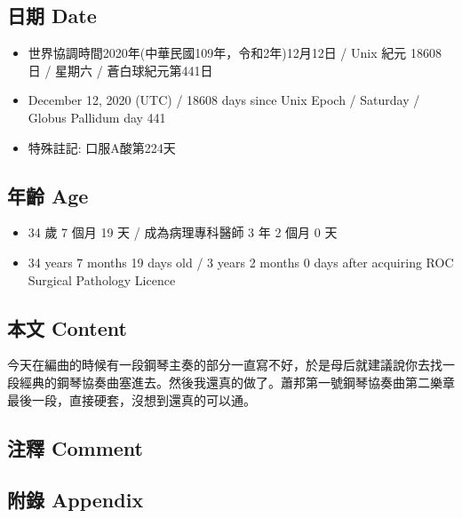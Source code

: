 \documentclass[a5paper, 10pt
]{book}
\providecommand{\tightlist}{%
  \setlength{\itemsep}{0pt}\setlength{\parskip}{0pt}}
\begin{document}
\hypertarget{ux65e5ux671f-date-11}{%
\subsection{日期 Date}\label{ux65e5ux671f-date-11}}

\begin{itemize}
\tightlist
\item
  世界協調時間2020年(中華民國109年，令和2年)12月12日 / Unix 紀元 18608
  日 / 星期六 / 蒼白球紀元第441日
\item
  December 12, 2020 (UTC) / 18608 days since Unix Epoch / Saturday /
  Globus Pallidum day 441
\item
  特殊註記: 口服A酸第224天
\end{itemize}

\hypertarget{ux5e74ux9f61-age-11}{%
\subsection{年齡 Age}\label{ux5e74ux9f61-age-11}}

\begin{itemize}
\tightlist
\item
  34 歲 7 個月 19 天 / 成為病理專科醫師 3 年 2 個月 0 天
\item
  34 years 7 months 19 days old / 3 years 2 months 0 days after
  acquiring ROC Surgical Pathology Licence
\end{itemize}

\hypertarget{ux672cux6587-content-11}{%
\subsection{本文 Content}\label{ux672cux6587-content-11}}

今天在編曲的時候有一段鋼琴主奏的部分一直寫不好，於是母后就建議說你去找一段經典的鋼琴協奏曲塞進去。然後我還真的做了。蕭邦第一號鋼琴協奏曲第二樂章最後一段，直接硬套，沒想到還真的可以通。

\hypertarget{ux6ce8ux91cb-comment-11}{%
\subsection{注釋 Comment}\label{ux6ce8ux91cb-comment-11}}

\hypertarget{ux9644ux9304-appendix-11}{%
\subsection{附錄 Appendix}\label{ux9644ux9304-appendix-11}}
\end{document}
